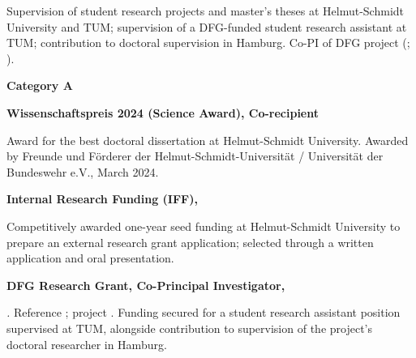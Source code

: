 \documentclass[11pt,a4paper]{article}
\newcommand{\cvsection}[1]{\par\vspace{7pt}{\large\bfseries #1}\par\vspace{3pt}}
\begin{document}
Supervision of student research projects and master's theses at Helmut-Schmidt University and TUM; supervision of a DFG-funded student research assistant at TUM; contribution to doctoral supervision in Hamburg. Co-PI of DFG project \DFGProject{} (\DFGRef; \DFGPeriod).

\newpage
\cvsection{Scientific Results}
\textbf{Category A}
\begin{enumerate}[leftmargin=1.7em,itemsep=7pt,topsep=5pt]

\end{enumerate}

\newpage
\cvsection{Academic Distinctions}
\textbf{Wissenschaftspreis 2024 (Science Award), Co-recipient}

Award for the best doctoral dissertation at Helmut-Schmidt University. Awarded by Freunde und Förderer der Helmut-Schmidt-Universität / Universität der Bundeswehr e.V., March 2024.

\textbf{Internal Research Funding (IFF), \IFFPeriod}

Competitively awarded one-year seed funding at Helmut-Schmidt University to prepare an external research grant application; selected through a written application and oral presentation.

\textbf{DFG Research Grant, Co-Principal Investigator, \DFGPeriod}

\textit{\DFGTitle.} Reference \DFGRef; project \DFGProject. Funding secured for a student research assistant position supervised at TUM, alongside contribution to supervision of the project's doctoral researcher in Hamburg.

\cvsection{Data protection and consent to the processing of optional data}

\end{document}
